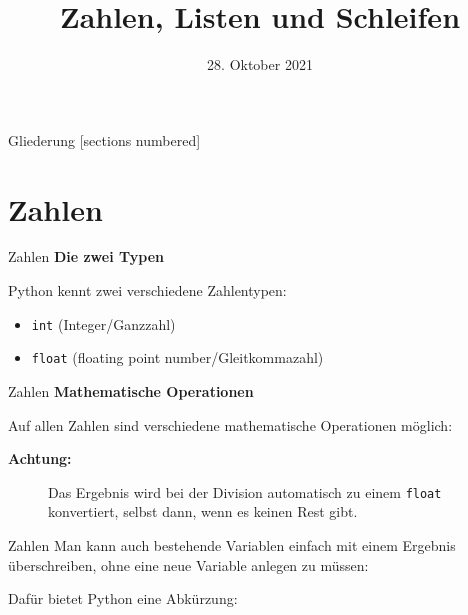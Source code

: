 



\title{Zahlen, Listen und Schleifen}
\date{28. Oktober 2021}



	
\maketitle

\begin{frame}{Gliederung}
	[sections numbered]
	\tableofcontents
\end{frame}

\section{Zahlen}
\begin{frame}{Zahlen}
	\textbf{Die zwei Typen}
	\linebreak
	
	Python kennt zwei verschiedene Zahlentypen: 
	\begin{itemize}
		\item \alert{\texttt{int}} (Integer/Ganzzahl)
		
		\item \alert{\texttt{float}} (floating point number/Gleitkommazahl)
		
	\end{itemize}		
\end{frame}

\begin{frame}{Zahlen}
	\textbf{Mathematische Operationen}
	\linebreak

	Auf allen Zahlen sind verschiedene mathematische Operationen möglich:
	
	\begin{description}
		\item[\textbf{Achtung:}] Das Ergebnis wird bei der Division automatisch zu einem \alert{\texttt{float}} konvertiert, selbst dann, wenn es keinen Rest gibt.
	\end{description}
\end{frame}

\begin{frame}{Zahlen}
	Man kann auch bestehende Variablen einfach mit einem Ergebnis überschreiben, ohne eine neue Variable anlegen zu müssen:
	
	Dafür bietet Python eine Abkürzung:
	
\end{frame}

